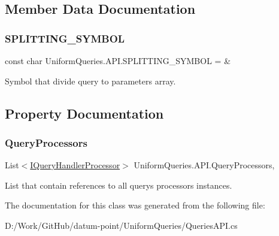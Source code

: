 \subsection{Member Data Documentation}
\mbox{\label{class_uniform_queries_1_1_a_p_i_aa906970223172f9f2068baa410b621d8}} 
\subsubsection{\texorpdfstring{S\+P\+L\+I\+T\+T\+I\+N\+G\+\_\+\+S\+Y\+M\+B\+OL}{SPLITTING\_SYMBOL}}
{\footnotesize\ttfamily const char Uniform\+Queries.\+A\+P\+I.\+S\+P\+L\+I\+T\+T\+I\+N\+G\+\_\+\+S\+Y\+M\+B\+OL = \textquotesingle{}\&\textquotesingle{}}



Symbol that divide query to parameters array. 



\subsection{Property Documentation}
\mbox{\label{class_uniform_queries_1_1_a_p_i_a8fe90206df6a1ae2b052b82c30a32037}} 
\subsubsection{\texorpdfstring{Query\+Processors}{QueryProcessors}}
{\footnotesize\ttfamily List$<$\mbox{\hyperlink{interface_uniform_queries_1_1_i_query_handler_processor}{I\+Query\+Handler\+Processor}}$>$ Uniform\+Queries.\+A\+P\+I.\+Query\+Processors\hspace{0.3cm}{\ttfamily [static]}, {\ttfamily [get]}}



List that contain references to all query\textquotesingle{}s processors instances. 



The documentation for this class was generated from the following file\+:\begin{DoxyCompactItemize}
\item 
D\+:/\+Work/\+Git\+Hub/datum-\/point/\+Uniform\+Queries/Queries\+A\+P\+I.\+cs\end{DoxyCompactItemize}
